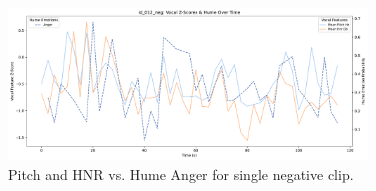   

\begin{figure}[H]
    \centering
    \includegraphics[width=0.85\textwidth]{png/results/rq3_2/combined_zscore_hume_id_012_neg_6.pdf} 
    \caption{Pitch and HNR vs. Hume Anger for single negative clip.}
    \label{fig:012_neg-anger}
\end{figure}

